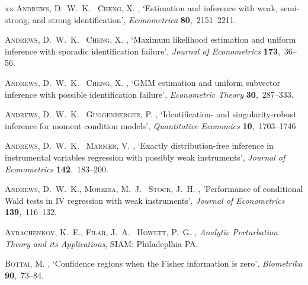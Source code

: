 \documentclass[hidelinks, 11 pt, a4paper, pdflatex]{article}
\begin{document}
{\begin{thebibliography}{xx}
 \textsc{Andrews, D.~W.~K. \harvardand\ Cheng, X.}  \harvardyearright ,
  `Estimation and inference with weak, semi-strong, and strong identification',
  {\em Econometrica} {\bf 80},~2151--2211.

 \textsc{Andrews, D.~W.~K. \harvardand\ Cheng, X. } \harvardyearright ,
  `Maximum likelihood estimation and uniform inference with sporadic  identification failure',
  {\em Journal of Econometrics} {\bf 173},~36--56.

 \textsc{Andrews, D.~W.~K. \harvardand\ Cheng, X.}  \harvardyearright ,
  `GMM estimation and uniform subvector inference with possible identification failure',
  {\em Econometric Theory} {\bf 30},~287--333.

 \textsc{Andrews, D.~W.~K. \harvardand\ Guggenberger, P.}  \harvardyearright ,
  `Identification- and singularity-robust inference for moment condition models',
  {\em Quantitative Economics} {\bf 10},~1703--1746

 \textsc{Andrews, D.~W.~K. \harvardand\ Marmer, V.}  \harvardyearright ,
  `Exactly distribution-free inference in instrumental variables regression with possibly weak instruments',
  {\em Journal of Econometrics} {\bf 142},~183--200.

 \textsc{Andrews, D.~W.~K., Moreira, M.~J. \harvardand\ Stock, J.~H.}  \harvardyearright ,
  'Performance of conditional Wald tests in IV regression with weak instruments',
  {\em Journal of Econometrics} {\bf 139},~116--132.

 \textsc{Avrachenkov, K.~E., Filar, J.~A. \harvardand\ Howett, P.~G.}  \harvardyearright ,
  {\em Analytic Perturbation Theory and its Applications}, SIAM: Philadeplhia PA.

 \textsc{Bottai, M.}  \harvardyearright ,
  `Confidence regions when the Fisher information is zero',
  {\em Biometrika} {\bf 90},~73--84.


\end{thebibliography}}
\end{document}
